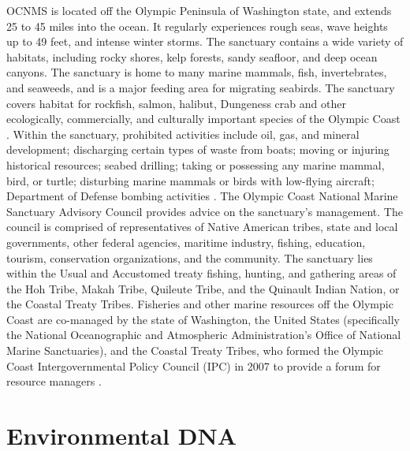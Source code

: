 \documentclass[12pt,twoside]{reedthesis}
\begin{document}
OCNMS is located off the Olympic Peninsula of Washington state, and extends 25 to 45 miles into the ocean. It regularly experiences rough seas, wave heights up to 49 feet, and intense winter storms. The sanctuary contains a wide variety of habitats, including rocky shores, kelp forests, sandy seafloor, and deep ocean canyons. The sanctuary is home to many marine mammals, fish, invertebrates, and seaweeds, and is a major feeding area for migrating seabirds. The sanctuary covers habitat for rockfish, salmon, halibut, Dungeness crab and other ecologically, commercially, and culturally important species of the Olympic Coast \autocite{FishOlympicCoast}.  Within the sanctuary, prohibited activities include oil, gas, and mineral development; discharging certain types of waste from boats; moving or injuring historical resources; seabed drilling; taking or possessing any marine mammal, bird, or turtle; disturbing marine mammals or birds with low-flying aircraft; Department of Defense bombing activities \autocite{15CFRPart}. The Olympic Coast National Marine Sanctuary Advisory Council provides advice on the sanctuary's management. The council is comprised of representatives of Native American tribes, state and local governments, other federal agencies, maritime industry, fishing, education, tourism, conservation organizations, and the community. The sanctuary lies within the Usual and Accustomed treaty fishing, hunting, and gathering areas of the Hoh Tribe, Makah Tribe, Quileute Tribe, and the Quinault Indian Nation, or the Coastal Treaty Tribes. Fisheries and other marine resources off the Olympic Coast are co-managed by the state of Washington, the United States (specifically the National Oceanographic and Atmospheric Administration's Office of National Marine Sanctuaries), and the Coastal Treaty Tribes, who formed the Olympic Coast Intergovernmental Policy Council (IPC) in 2007 to provide a forum for resource managers \autocite{IntergovernmentalPolicyCouncil}.
	
\section{Environmental DNA}
\end{document}
